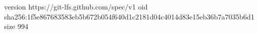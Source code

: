version https://git-lfs.github.com/spec/v1
oid sha256:1f5e867683583eb5b672b054f640d1c2181d04c4014d83e15eb36b7a7035b6d1
size 994
